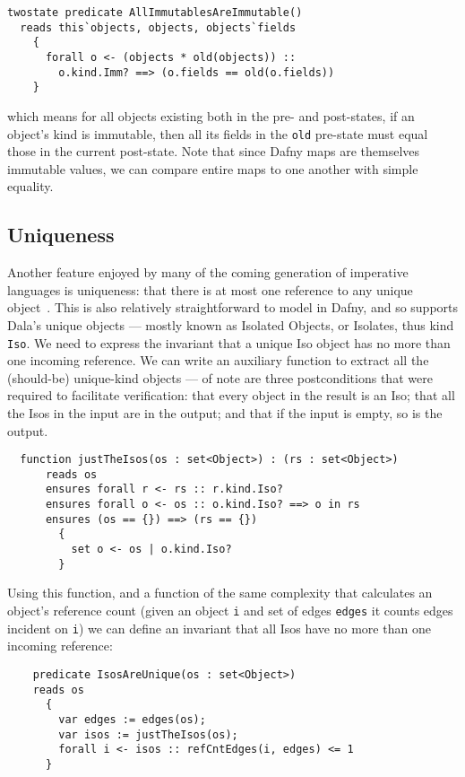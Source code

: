 \begin{lstlisting}
twostate predicate AllImmutablesAreImmutable() 
  reads this`objects, objects, objects`fields
    {
      forall o <- (objects * old(objects)) :: 
        o.kind.Imm? ==> (o.fields == old(o.fields))
    }
\end{lstlisting}

\noindent which means for all objects existing both in the pre- and post-states, if an object's kind is immutable, then all its fields in the \lstinline+old+ pre-state must equal those in the current post-state. Note that since Dafny maps are themselves immutable values, we can compare entire maps to one another with simple equality.

\subsection{Uniqueness}

Another feature enjoyed by many of the coming generation of imperative languages is uniqueness: that there is at most one reference to any unique object~\cite{Islands}. This is also relatively straightforward to model in Dafny,
and so supports Dala's  unique objects --- mostly known as Isolated Objects, or Isolates, thus kind \lstinline+Iso+.
We need to express the invariant that a unique Iso object has no more than one incoming reference. We can write an auxiliary function to extract all the (should-be) unique-kind objects --- of note are three postconditions that were required to facilitate verification: that every object in the result is an Iso; that all the Isos in the input are in the output; and that if the input is empty, so is the output.

\begin{lstlisting}
  function justTheIsos(os : set<Object>) : (rs : set<Object>) 
      reads os
      ensures forall r <- rs :: r.kind.Iso?
      ensures forall o <- os :: o.kind.Iso? ==> o in rs
      ensures (os == {}) ==> (rs == {})
        {
          set o <- os | o.kind.Iso?
        }  
    \end{lstlisting}

Using this function, and a function of the same complexity that
calculates an object's reference count (given an object \lstinline+i+ and set of
edges \lstinline+edges+ it counts edges incident on \lstinline+i+) 
we can  define an invariant that all  Isos have no more than one incoming reference:

\begin{lstlisting}
    predicate IsosAreUnique(os : set<Object>)
    reads os
      {
        var edges := edges(os);
        var isos := justTheIsos(os);
        forall i <- isos :: refCntEdges(i, edges) <= 1
      } 
\end{lstlisting}

